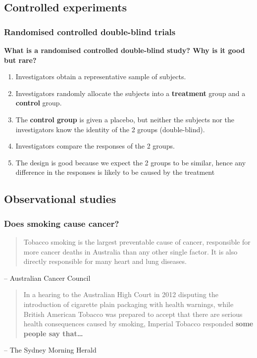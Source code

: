 \documentclass[a4paper]{article}\usepackage[]{graphicx}\usepackage[]{xcolor}
\begin{document}
\subsection{Controlled experiments}
\subsubsection{Randomised controlled double-blind trials}
\begin{greenbox}
	\textbf{What is a randomised controlled double-blind study? Why is it good but rare?}
\end{greenbox}
\begin{enumerate}
	\item Investigators obtain a representative sample of subjects.
	\item Investigators randomly allocate the subjects into a \textbf{\textcolor{mygreen}{treatment}} group and a \textbf{\textcolor{myred}{control}} group.
	\item The \textbf{\textcolor{myred}{control group}} is given a placebo, but neither the subjects nor the investigators know the identity of the 2 groups (double-blind).
	\item Investigators compare the responses of the 2 groups.
	\item The design is good because we expect the 2 groups to be similar, hence any difference in the responses is likely to be caused by the treatment
\end{enumerate}
\subsection{Observational studies}
\subsubsection{Does smoking cause cancer?}
\begin{tcolorbox}[bluestyleline]
	\blockquote{Tobacco smoking is the largest preventable cause of cancer, responsible for more cancer deaths in Australia than any other single factor. It is also directly responsible for many heart and lung diseases.}
	-- Australian Cancer Council
\end{tcolorbox}
\begin{tcolorbox}[bluestyleline]
	\blockquote{In a hearing to the Australian High Court in 2012 disputing the introduction of cigarette plain packaging with health warnings, while British American Tobacco was prepared to accept that there are serious health consequences caused by smoking, Imperial Tobacco responded \textbf{some people say that\dots}}
	-- The Sydney Morning Herald
\end{tcolorbox}
\end{document}

